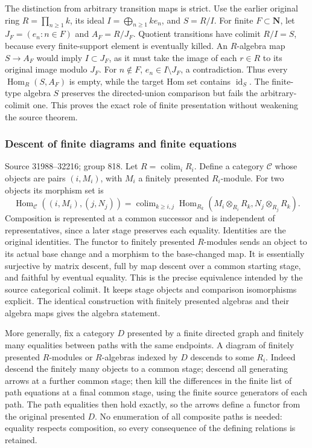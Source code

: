 The distinction from arbitrary transition maps is strict. Use the earlier original ring \(R=\prod_{n\ge1}k\), its ideal \(I=\bigoplus_{n\ge1}ke_n\), and \(S=R/I\). For finite \(F\subset\mathbf N\), let \(J_F=(e_n:n\in F)\) and \(A_F=R/J_F\). Quotient transitions have colimit \(R/I=S\), because every finite-support element is eventually killed. An \(R\)-algebra map \(S\to A_F\) would imply \(I\subset J_F\), as it must take the image of each \(r\in R\) to its original image modulo \(J_F\). For \(n\notin F\), \(e_n\in I\setminus J_F\), a contradiction. Thus every \(\operatorname{Hom}_R(S,A_F)\) is empty, while the target Hom set contains \(\operatorname{id}_S\). The finite-type algebra \(S\) preserves the directed-union comparison but fails the arbitrary-colimit one. This proves the exact role of finite presentation without weakening the source theorem.

\subsubsection{Descent of finite diagrams and finite equations}\label{algebra-proof-036-descent-of-finite-diagrams-and-finite-equations}

Source 31988--32216; group 818. Let \(R=\operatorname{colim}_iR_i\). Define a category \(\mathcal C\) whose objects are pairs \((i,M_i)\), with \(M_i\) a finitely presented \(R_i\)-module. For two objects its morphism set is \[
\operatorname{Hom}_{\mathcal C}((i,M_i),(j,N_j))
 =
\operatorname{colim}_{k\ge i,j}
\operatorname{Hom}_{R_k}(M_i\otimes_{R_i}R_k,N_j\otimes_{R_j}R_k).
\] Composition is represented at a common successor and is independent of representatives, since a later stage preserves each equality. Identities are the original identities. The functor to finitely presented \(R\)-modules sends an object to its actual base change and a morphism to the base-changed map. It is essentially surjective by matrix descent, full by map descent over a common starting stage, and faithful by eventual equality. This is the precise equivalence intended by the source categorical colimit. It keeps stage objects and comparison isomorphisms explicit. The identical construction with finitely presented algebras and their algebra maps gives the algebra statement.

More generally, fix a category \(D\) presented by a finite directed graph and finitely many equalities between paths with the same endpoints. A diagram of finitely presented \(R\)-modules or \(R\)-algebras indexed by \(D\) descends to some \(R_i\). Indeed descend the finitely many objects to a common stage; descend all generating arrows at a further common stage; then kill the differences in the finite list of path equations at a final common stage, using the finite source generators of each path. The path equalities then hold exactly, so the arrows define a functor from the original presented \(D\). No enumeration of all composite paths is needed: equality respects composition, so every consequence of the defining relations is retained.

